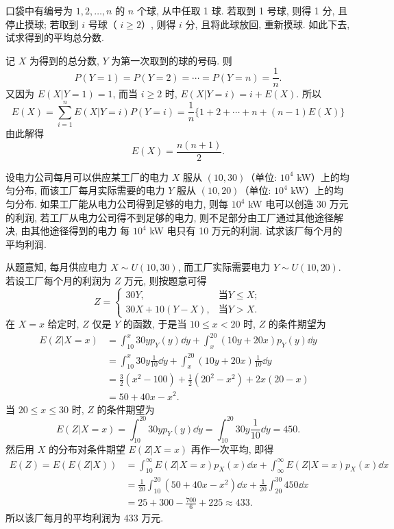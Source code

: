 	\begin{example}\label{exam:3.5.8}
		口袋中有编号为 $1,2,\ldots,n$ 的 $n$ 个球, 从中任取 1 球. 若取到 1 号球, 则得 1 分,
		且停止摸球; 若取到 $i$ 号球（ $i\geq 2$）, 则得 $i$ 分, 且将此球放回, 重新摸球.
		如此下去, 试求得到的平均总分数.
	\end{example}
	\begin{solution}
		记 $X$ 为得到的总分数, $Y$ 为第一次取到的球的号码. 则
		\[
			P(Y=1)=P(Y=2)=\cdots=P(Y=n)=\frac{1}{n}.
			\]
		又因为 $E(X | Y=1)=1$, 而当 $i\geq 2$ 时, $E(X | Y=i)=i+E(X)$. 所以
		\[
			E(X)=\sum_{i=1}^{n} E(X | Y=i) P(Y=i)=\frac{1}{n}\{1+2+\cdots+n+(n-1) E(X)\}
			\]
			由此解得
			\[
				E(X)=\frac{n(n+1)}{2}.
				\]
	\end{solution}
	\begin{example}
		设电力公司每月可以供应某工厂的电力 $X$ 服从 $(10,30)$（单位: $10^4$ kW）上的均匀分布,
		而该工厂每月实际需要的电力 $Y$ 服从 $(10,20)$（单位: $10^4$ kW）上的均匀分布.
		如果工厂能从电力公司得到足够的电力, 则每 $10^4$ kW 电可以创造 30 万元的利润,
		若工厂从电力公司得不到足够的电力, 则不足部分由工厂通过其他途径解决, 由其他途径得到的电力
		每 $10^4$ kW 电只有 10 万元的利润. 试求该厂每个月的平均利润.
	\end{example}
	\begin{solution}
		从题意知, 每月供应电力 $X\sim U(10,30)$, 而工厂实际需要电力 $Y\sim U(10,20)$.
		若设工厂每个月的利润为 $Z$ 万元, 则按题意可得
		\[
		Z=\begin{cases}30 Y, & \text{当} Y\leq X;\\
			30 X+10(Y-X), &  \text{当} Y > X.
			\end{cases}
			\]
		在 $X=x$ 给定时, $Z$ 仅是 $Y$ 的函数, 于是当 $10\leq x<20$ 时, $Z$ 的条件期望为
		\begin{align*}
			E(Z | X=x)&=\int_{10}^{x} 30 y p_{Y}(y) \dd y+\int_{x}^{20}(10 y+20 x) p_{Y}(y) \dd y	\\
				&=\int_{10}^{x} 30 y \frac{1}{10} \dd y+\int_{x}^{20}(10 y+20 x) \frac{1}{10} \dd y	\\
				&=\frac{3}{2}\left(x^{2}-100\right)+\frac{1}{2}\left(20^{2}-x^{2}\right)+2 x(20-x)	\\
				&=50+40 x-x^{2}.
		\end{align*}
		当 $20\leq x\leq 30$ 时, $Z$ 的条件期望为
		\[
			E(Z | X=x)=\int_{10}^{20} 30 y p_{Y}(y) \dd y=\int_{10}^{20} 30 y \frac{1}{10} \dd y=450.
			\]
		然后用 $X$ 的分布对条件期望 $E(Z|X=x)$ 再作一次平均, 即得
		\begin{align*}
		E(Z)=E(E(Z | X)) &=\int_{10}^{\infty} E(Z | X=x) p_{X}(x) \dd x+\int_{\infty}^{\infty} E(Z | X=x) p_{X}(x) \dd x \\
		&=\frac{1}{20} \int_{10}^{20}\left(50+40 x-x^{2}\right) \dd x+\frac{1}{20} \int_{20}^{30} 450 \dd x \\
		&=25+300-\frac{700}{6}+225 \approx 433. \end{align*}
		所以该厂每月的平均利润为 433 万元.
	\end{solution}
